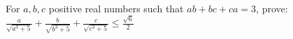For $a,b,c$ positive real numbers such that $ab+bc+ca=3$,  prove:$ \frac{a}{\sqrt{a^3+5}}+\frac{b}{\sqrt{b^3+5}}+\frac{c}{\sqrt{c^3+5}} \leq \frac{\sqrt{6}}{2}$